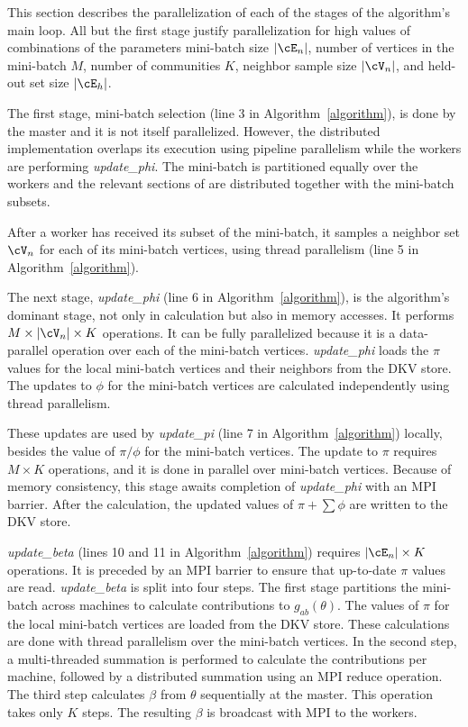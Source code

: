 This section describes the parallelization of each of the stages of the
algorithm's main loop. All but the first stage justify parallelization for
high values of combinations of the parameters mini-batch size $|\Minibatch|$,
number of vertices in the mini-batch $M$,
number of communities $K$, neighbor sample size $|\Neighbors|$, and held-out set
size $|\cE_h|$.

The first stage, mini-batch selection (line 3 in Algorithm~\ref{algorithm}),
is done by the master and it is
not itself parallelized. However, the distributed implementation overlaps
its execution using pipeline parallelism while the workers are
performing \textit{update\_phi}. The mini-batch is partitioned equally over
the workers and the relevant sections of \Edges are distributed together with the
mini-batch subsets.

After a worker has received its subset of the mini-batch, it samples a neighbor
set $\Neighbors$ for each of its mini-batch vertices, using thread parallelism
(line 5 in Algorithm~\ref{algorithm}).

The next stage, \textit{update\_phi} (line 6 in Algorithm~\ref{algorithm}), is the algorithm's dominant stage, not
only in calculation but also in memory accesses. It performs $M \times
|\Neighbors| \times
K$ operations. It can be fully parallelized because it is a data-parallel
operation over each of the mini-batch vertices. \textit{update\_phi} loads the
$\pi$ values for the local mini-batch vertices and their neighbors from the
DKV store. The updates to $\phi$ for the mini-batch vertices are calculated
independently using thread parallelism.

These updates are used by \textit{update\_pi} (line 7 in
Algorithm~\ref{algorithm}) locally, besides the value of
$\pi/\phi$ for the mini-batch vertices. The update to $\pi$ requires
$M \times K$ operations, and it is done in parallel over mini-batch vertices. Because of
memory consistency, this stage awaits completion of \textit{update\_phi} with
an MPI barrier. After the calculation, the updated values of $\pi+\sum\phi$
are written to the DKV store.

\textit{update\_beta} (lines 10 and 11 in Algorithm~\ref{algorithm}) requires $|\Minibatch| \times K$ operations. It is preceded by an MPI
barrier to ensure that up-to-date $\pi$ values are read. \textit{update\_beta}
is split into four steps. The first stage partitions the mini-batch across
machines to calculate contributions to $g_{ab}(\theta)$. The values of $\pi$ for
the local mini-batch vertices are loaded from the DKV store. These calculations
are done with thread parallelism over the mini-batch vertices. In the second step,
a multi-threaded summation is performed to calculate the contributions per
machine, followed by a distributed summation using an MPI reduce operation. The
third step calculates $\beta$ from $\theta$ sequentially at the master. This
operation takes only $K$ steps. The resulting $\beta$ is broadcast with MPI
to the workers.

